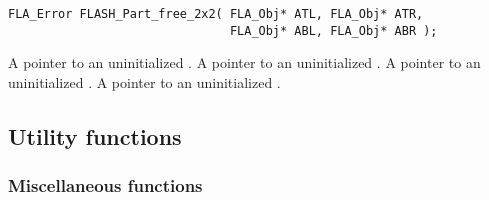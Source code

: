 \begin{flaspec}
\begin{verbatim}
FLA_Error FLASH_Part_free_2x2( FLA_Obj* ATL, FLA_Obj* ATR,
                               FLA_Obj* ABL, FLA_Obj* ABR );
\end{verbatim}
\rvalue{
\flasuccess
}
\begin{params}
                         {A pointer to an uninitialized \flaobjns.}
                         {A pointer to an uninitialized \flaobjns.}
                         {A pointer to an uninitialized \flaobjns.}
                         {A pointer to an uninitialized \flaobjns.}
\end{params}
\end{flaspec}



\subsection{Utility functions}
\label{sec:flash-utility-functions}




\subsubsection{Miscellaneous functions}




